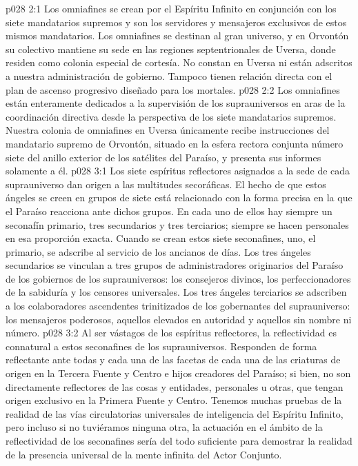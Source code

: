 \vs p028 2:1 Los omniafines se crean por el Espíritu Infinito en conjunción con los siete mandatarios supremos y son los servidores y mensajeros exclusivos de estos mismos mandatarios. Los omniafines se destinan al gran universo, y en Orvontón su colectivo mantiene su sede en las regiones septentrionales de Uversa, donde residen como colonia especial de cortesía. No constan en Uversa ni están adscritos a nuestra administración de gobierno. Tampoco tienen relación directa con el plan de ascenso progresivo diseñado para los mortales.
\vs p028 2:2 Los omniafines están enteramente dedicados a la supervisión de los suprauniversos en aras de la coordinación directiva desde la perspectiva de los siete mandatarios supremos. Nuestra colonia de omniafines en Uversa únicamente recibe instrucciones del mandatario supremo de Orvontón, situado en la esfera rectora conjunta número siete del anillo exterior de los satélites del Paraíso, y presenta sus informes solamente a él.
\vs p028 3:1 Los siete espíritus reflectores asignados a la sede de cada suprauniverso dan origen a las multitudes secoráficas. El hecho de que estos ángeles se creen en grupos de siete está relacionado con la forma precisa en la que el Paraíso reacciona ante dichos grupos. En cada uno de ellos hay siempre un seconafín primario, tres secundarios y tres terciarios; siempre se hacen personales en esa proporción exacta. Cuando se crean estos siete seconafines, uno, el primario, se adscribe al servicio de los ancianos de días. Los tres ángeles secundarios se vinculan a tres grupos de administradores originarios del Paraíso de los gobiernos de los suprauniversos: los consejeros divinos, los perfeccionadores de la sabiduría y los censores universales. Los tres ángeles terciarios se adscriben a los colaboradores ascendentes trinitizados de los gobernantes del suprauniverso: los mensajeros poderosos, aquellos elevados en autoridad y aquellos sin nombre ni número.
\vs p028 3:2 Al ser vástagos de los espíritus reflectores, la reflectividad es connatural a estos seconafines de los suprauniversos. Responden de forma reflectante ante todas y cada una de las facetas de cada una de las criaturas de origen en la Tercera Fuente y Centro e hijos creadores del Paraíso; si bien, no son directamente reflectores de las cosas y entidades, personales u otras, que tengan origen exclusivo en la Primera Fuente y Centro. Tenemos muchas pruebas de la realidad de las vías circulatorias universales de inteligencia del Espíritu Infinito, pero incluso si no tuviéramos ninguna otra, la actuación en el ámbito de la reflectividad de los seconafines sería del todo suficiente para demostrar la realidad de la presencia universal de la mente infinita del Actor Conjunto.

